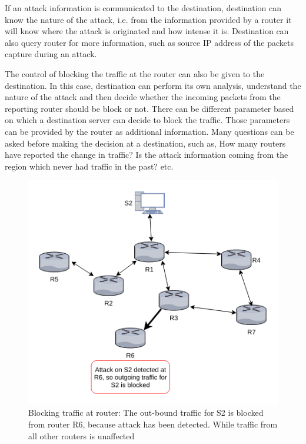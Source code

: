 \documentclass[12pt,oneside,a4paper]{article}
\begin{document}
If an attack information is communicated to the destination, destination can know the nature of the attack, i.e. from the information provided by a router it will know where the attack is originated and how intense it is. Destination can also query router for more information, such as source IP address of the packets capture during an attack.

The control of blocking the traffic at the router can also be given to the destination. In this case, destination can perform its own analysis, understand the nature of the attack and then decide whether the incoming packets from the reporting router should be block or not. There can be different parameter based on which a destination server can decide to block the traffic. Those parameters can be provided by the router as additional information. Many questions can be asked before making the decision at a destination, such as, How many routers have reported the change in traffic? Is the attack information coming from the region which never had traffic in the past? etc.

\begin{figure}[H]
\centering
\includegraphics[scale=0.60]{mitigation_path.png}
\caption{Blocking traffic at router: The out-bound traffic for S2 is blocked from router R6,
because attack has been detected. While traffic from all other routers is unaffected} \label{fig:mitigation_path}
\end{figure}
\end{document}
